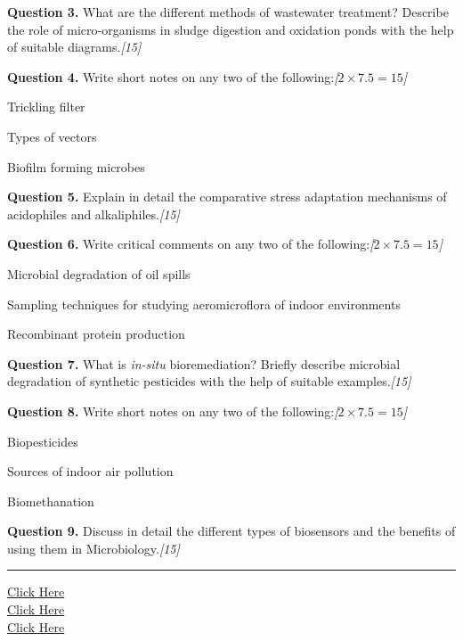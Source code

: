 \documentclass[11pt,a4paper]{article}
\newcommand{\pts}[1]{\hfill   \textit{[#1]}}
\begin{document}
\medskip


\noindent   \textbf{Question 3.} What are the different methods of wastewater treatment? Describe the role of micro-organisms in sludge digestion and oxidation ponds with the help of suitable diagrams.\pts{15}

\medskip


\noindent   \textbf{Question 4.} Write short notes on any two of the following:\pts{$2  \times 7.5 = 15$}

\begin{parts}
  \item Trickling filter
  \item Types of vectors
  \item Biofilm forming microbes
\end{parts}

\medskip


\noindent   \textbf{Question 5.} Explain in detail the comparative stress adaptation mechanisms of acidophiles and alkaliphiles.\pts{15}

\medskip


\noindent   \textbf{Question 6.} Write critical comments on any two of the following:\pts{$2  \times 7.5 = 15$}

\begin{parts}
  \item Microbial degradation of oil spills
  \item Sampling techniques for studying aeromicroflora of indoor environments
  \item Recombinant protein production
\end{parts}

\medskip


\noindent   \textbf{Question 7.} What is   \textit{in-situ} bioremediation? Briefly describe microbial degradation of synthetic pesticides with the help of suitable examples.\pts{15}

\medskip


\noindent   \textbf{Question 8.} Write short notes on any two of the following:\pts{$2  \times 7.5 = 15$}

\begin{parts}
  \item Biopesticides
  \item Sources of indoor air pollution
  \item Biomethanation
\end{parts}

\medskip


\noindent   \textbf{Question 9.} Discuss in detail the different types of biosensors and the benefits of using them in Microbiology.\pts{15}

\vfill
\rule{\linewidth}{0.4pt}

\begin{center}\small
\href{https://bhu-exam.vercel.app/}{Click Here}\\[4pt]\href{https://me-aryan.vercel.app/}{Click Here}\\[4pt]\href{https://quashan-me.vercel.app/}{Click Here}
\end{center}
\end{document}
